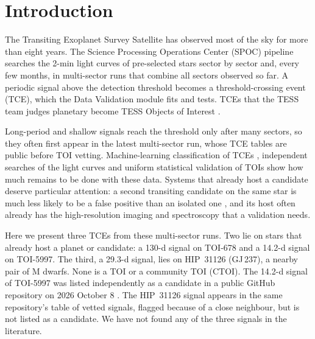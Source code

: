 \documentclass[twocolumn,numberedappendix,appendixfloats]{openjournal}
\begin{document}
\maketitle

\section{Introduction}
\label{sec:intro}

The Transiting Exoplanet Survey Satellite \citep[TESS;][]{ricker2015} has
observed most of the sky for more than eight years. The Science Processing
Operations Center (SPOC) pipeline \citep{jenkins2016} searches the 2-min light
curves of pre-selected stars sector by sector and, every few months, in
multi-sector runs that combine all sectors observed so far. A periodic signal
above the detection threshold becomes a threshold-crossing event (TCE), which
the Data Validation module \citep{twicken2018,li2019} fits and tests. TCEs that
the TESS team judges planetary become TESS Objects of Interest
\citep[TOIs;][]{guerrero2021}.

Long-period and shallow signals reach the threshold only after many sectors,
so they often first appear in the latest multi-sector run, whose TCE tables are
public before TOI vetting. Machine-learning classification of TCEs
\citep{valizadegan2025}, independent searches of the light curves
\citep{lafarga2026} and uniform statistical validation of TOIs
\citep{collier2026} show how much remains to be done with these data. Systems
that already host a candidate deserve particular attention: a second
transiting candidate on the same star is much less likely to be a false
positive than an isolated one \citep{lissauer2012}, and its host often already
has the high-resolution imaging and spectroscopy that a validation needs.

Here we present three TCEs from these multi-sector runs. Two lie on stars that already
host a planet or candidate: a 130-d signal on TOI-678 and a 14.2-d signal on
TOI-5997. The third, a 29.3-d signal, lies on HIP~31126 (GJ\,237), a nearby
pair of M dwarfs. None is a TOI or a community TOI (CTOI). The 14.2-d signal of
TOI-5997 was listed independently as a candidate in a public GitHub repository
on 2026 October 8 \citep{eumemic2026}. The HIP~31126 signal appears in the same
repository's table of vetted signals, flagged because of a close neighbour, but
is not listed as a candidate. We have not found any of the three signals in the literature.
\end{document}
